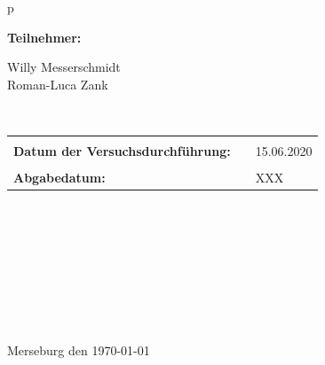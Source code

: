 \begin{center}
\begin{tabular}{p{\textwidth}}

\begin{center}
\Large{\textbf{Teilnehmer:}} \\ 
\end{center}
\begin{center}
\large{Willy Messerschmidt \\
	Roman-Luca Zank} \\
\end{center}


\\

\begin{center}
\begin{tabular}{lll}
&&\\
\large{\textbf{Datum der Versuchsdurchführung:}}&& \large{15.06.2020}\\
&&\\
\large{\textbf{Abgabedatum:}}&& \large{XXX}
\end{tabular}
\end{center}

\\ \\ \\ \\ \\ \\ \\ \\ 
\large{Merseburg den \today}

\end{tabular}
\end{center}
